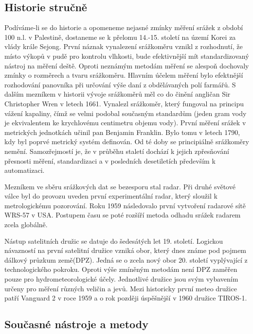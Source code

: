 \documentclass[a4paper,12pt]{article}
\begin{document}
\subsection{Historie stručně}
Podíváme-li se do historie a opomeneme nejasné zmínky měření srážek z období 100 n.l. v Palestině, dostaneme se k přelomu 14.-15. století na území Korei za vlády krále Sejong.\cite{sejong} První náznak vynalezení srážkoměru vznikl z rozhodnutí, že místo výkopů v pudě pro kontrolu vlhkosti, bude efektivnější mít standardizovaný nástroj na měření deště. Oproti neznámým metodám měření se alespoň dochovaly zmínky o rozměrech a tvaru srážkoměru. Hlavním účelem měření bylo efektnější rozhodování panovníka při určování výše daní z obdělávaných polí farmářů. S dalším mezníkem v historii vývoje srážkoměrů měl co do činění angličan Sir Christopher Wren v letech 1661.\cite{wren} Vynalezl srážkoměr, který fungoval na principu vážení kapaliny, čímž se velmi podobal současným standardům (jeden gram vody je ekvivalentem ke krychlovému centimetru objemu vody). První měření srážek v metrických jednotkách učinil pan Benjamin Franklin. Bylo tomu v letech 1790, kdy byl poprvé metrický systém definován. Od té doby se principiálně srážkoměry nemění. Samozřejmostí je, že v průběhu staletí dochází k jejich zpřesňování přesnosti měření, standardizaci a v posledních desetiletích především k automatizaci.

Mezníkem ve sběru srážkových dat se bezesporu stal radar. Při druhé světové válce byl do provozu uveden první experimentální radar, který sloužil k metrologickému pozorování. Roku 1959 následovalo první vytvoření radarové sítě WRS-57 v USA. Postupem času se poté rozšíří metoda odhadu srážek radarem zcela globálně. \cite{flash_floods}

Nástup satelitních družic se datuje do šedesátých let 19. století. Logickou návazností na první satelitní družice vzniká obor, který dnes známe pod pojmem dálkový průzkum země(DPZ). Jedná se o zcela nový obor 20. století vyplývající z technologického pokroku. Oproti výše zmíněným metodám není DPZ zaměřen pouze pro hydrometeorologické účely. Jednotlivé družice jsou svým vybavením určeny pro měření různých veličin a jevů. Mezi historicky první meteo družice patří Vanguard 2 v roce 1959\cite{vanguard} a o rok později úspěšnější v  1960 družice TIROS-1. 
     



\subsection{Současné nástroje a metody }
\end{document}
